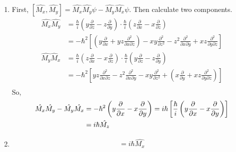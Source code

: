 \begin{solution}\
    \begin{enumerate}
        \item First, $[\hat{M_x},\hat{M_y}]=\hat{M_x}\hat{M_y}\psi-\hat{M_y}\hat{M_x}\psi$. Then calculate two components.
              \begin{align*}
                  \hat{M_x}\hat{M_y}   & =\frac{\hbar}{i}\left(y \frac{\partial}{\partial z}-z \frac{\partial}{\partial y}\right) \cdot
                  \frac{\hbar}{i}\left(z \frac{\partial}{\partial x}-x \frac{\partial}{\partial z}\right)                                                   \\
                                       & =-\hbar^{2}\left[\left(y \frac{\partial}{\partial x}+y z \frac{\partial^{2}}{\partial x \partial z}
                  \right)-x y \frac{\partial^{2}}{\partial z^{2}}-z^{2} \frac{\partial^{2}}{\partial x \partial y}+x z \frac{\partial^{2}}
                  {\partial y \partial z}\right]                                                                                                            \\
                  \hat{M_y}\hat{M}_{x} & =\frac{\hbar}{i}\left(z\frac{\partial}{\partial x}-x\frac{\partial}{\partial z}\right) \cdot \frac{\hbar}{i}
                  \left(y \frac{\partial}{\partial z}-z \frac{\partial}{\partial y}\right)                                                                  \\
                                       & =-\hbar^{2}\left[y z \frac{\partial^{2}}{\partial x \partial z}-z^{2}\frac{\partial^{2}}{\partial x \partial y}
                  -x y \frac{\partial^{2}}{\partial z^{2}}+\left(x \frac{\partial}{\partial y}+x z \frac{\partial^{2}}{\partial y \partial z}\right)\right] \\
              \end{align*}
              So,
              \begin{align*}
                  \hat{M_x}\hat{M_y}-\hat{M_y}\hat{M_x} & =-\hbar^{2}\left(y\frac{\partial }{\partial x}-x\frac{\partial }{\partial y}\right)=i \hbar\left[\frac{\hbar}{i}
                  \left(y\frac{\partial }{\partial x}-x\frac{\partial }{\partial y}\right)\right]                                                                          \\
                                                        & =i\hbar\hat{M_z}
              \end{align*}
        \item \begin{align*}
                  [\hat{M_y},\hat{M_z}]=i \hbar \hat{M_x} \\

\end{align*}
\end{enumerate}
\end{solution}
